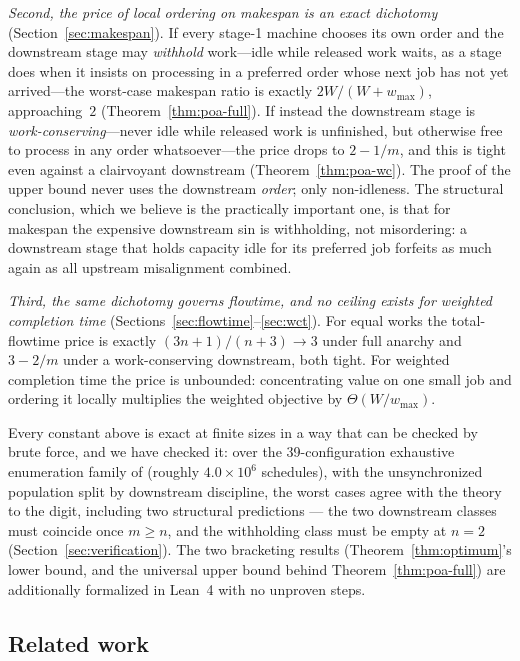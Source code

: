 \documentclass[sn-mathphys,NameDate]{sn-jnl}
\theoremstyle{thmstyleone}
\theoremstyle{thmstylethree}
\theoremstyle{thmstyletwo}
\begin{document}
\emph{Second, the price of local ordering on makespan is an exact
dichotomy} (Section~\ref{sec:makespan}). If every stage-1 machine
chooses its own order and the downstream stage may \emph{withhold}
work---idle while released work waits, as a stage does when it
insists on processing in a preferred order whose next job has not
yet arrived---the worst-case makespan ratio is exactly
$2W/(W+w_{\max})$, approaching~$2$ (Theorem~\ref{thm:poa-full}).
If instead the downstream stage is \emph{work-conserving}---never
idle while released work is unfinished, but otherwise free to
process in any order whatsoever---the price drops to $2 - 1/m$,
and this is tight even against a clairvoyant downstream
(Theorem~\ref{thm:poa-wc}). The proof of the upper bound never uses
the downstream \emph{order}; only non-idleness. The structural
conclusion, which we believe is the practically important one, is
that for makespan the expensive downstream sin is withholding, not
misordering: a downstream stage that holds capacity idle for its
preferred job forfeits as much again as all upstream misalignment
combined.

\emph{Third, the same dichotomy governs flowtime, and no ceiling
exists for weighted completion time}
(Sections~\ref{sec:flowtime}--\ref{sec:wct}). For equal works the
total-flowtime price is exactly $(3n+1)/(n+3) \to 3$ under full
anarchy and $3 - 2/m$ under a work-conserving downstream, both
tight. For weighted completion time the price is unbounded:
concentrating value on one small job and ordering it locally
multiplies the weighted objective by $\Theta(W/w_{\max})$.

Every constant above is exact at finite sizes in a way that can be
checked by brute force, and we have checked it: over the
39-configuration exhaustive enumeration family of \citet{bowmanA}
(roughly $4.0 \times 10^{6}$ schedules), with the unsynchronized
population split by downstream discipline, the worst cases agree
with the theory to the digit, including two structural predictions
--- the two downstream classes must coincide once $m \ge n$, and the
withholding class must be empty at $n = 2$
(Section~\ref{sec:verification}). The two bracketing results
(Theorem~\ref{thm:optimum}'s lower bound, and the universal upper
bound behind Theorem~\ref{thm:poa-full}) are additionally formalized
in Lean~4 with no unproven steps.

\subsection{Related work}
\end{document}
